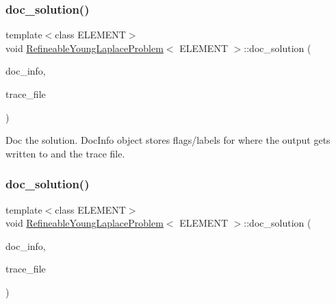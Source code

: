 \mbox{\label{classRefineableYoungLaplaceProblem_a4ec7313c8e4015b0c2af0bbef789e70f}} 
\subsubsection{\texorpdfstring{doc\+\_\+solution()}{doc\_solution()}\hspace{0.1cm}{\footnotesize\ttfamily [1/3]}}
{\footnotesize\ttfamily template$<$class E\+L\+E\+M\+E\+NT$>$ \\
void \hyperlink{classRefineableYoungLaplaceProblem}{Refineable\+Young\+Laplace\+Problem}$<$ E\+L\+E\+M\+E\+NT $>$\+::doc\+\_\+solution (\begin{DoxyParamCaption}\item[{Doc\+Info \&}]{doc\+\_\+info,  }\item[{ofstream \&}]{trace\+\_\+file }\end{DoxyParamCaption})}



Doc the solution. Doc\+Info object stores flags/labels for where the output gets written to and the trace file. 

\mbox{\label{classRefineableYoungLaplaceProblem_a4ec7313c8e4015b0c2af0bbef789e70f}} 
\subsubsection{\texorpdfstring{doc\+\_\+solution()}{doc\_solution()}\hspace{0.1cm}{\footnotesize\ttfamily [2/3]}}
{\footnotesize\ttfamily template$<$class E\+L\+E\+M\+E\+NT$>$ \\
void \hyperlink{classRefineableYoungLaplaceProblem}{Refineable\+Young\+Laplace\+Problem}$<$ E\+L\+E\+M\+E\+NT $>$\+::doc\+\_\+solution (\begin{DoxyParamCaption}\item[{Doc\+Info \&}]{doc\+\_\+info,  }\item[{ofstream \&}]{trace\+\_\+file }\end{DoxyParamCaption})}



